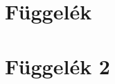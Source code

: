 \documentclass{book}
\begin{document}
\section{Függelék}
\subsection{}
\hulipsum[1]
\subsection{}
\hulipsum[1]
\section{Függelék 2}
\subsection{}
\hulipsum[1]
\subsection{}
\hulipsum[1]
\clearpage
\quote
\hulipsum[1-2]
\clearpage
\quotation
\hulipsum[1-2]
\clearpage
\begin{verse}
\hulipsum[1-2]
\end{verse}
\end{document}
